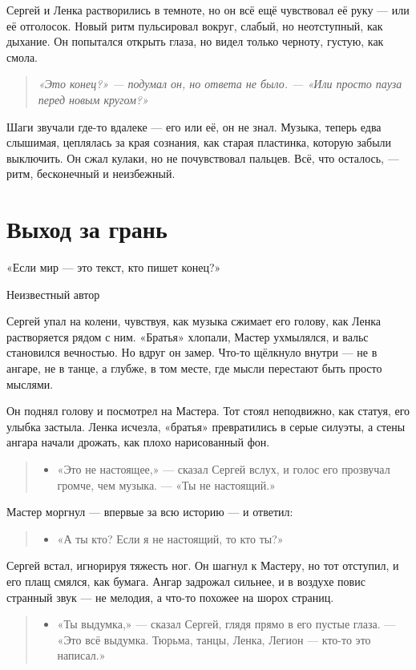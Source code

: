 \documentclass[12pt,a4paper]{book}
\newenvironment{dialogue}{\begin{quote}\itshape\begin{itemize}\item[]}{\end{itemize}\end{quote}}
\newenvironment{innerthought}{\begin{quote}\small\itshape}{\end{quote}}
\begin{document}
Сергей и Ленка растворились в темноте, но он всё ещё чувствовал её руку --- или её отголосок. Новый ритм пульсировал вокруг, слабый, но неотступный, как дыхание. Он попытался открыть глаза, но видел только черноту, густую, как смола.

\begin{innerthought}
«Это конец?» --- подумал он, но ответа не было. --- «Или просто пауза перед новым кругом?»
\end{innerthought}

Шаги звучали где-то вдалеке --- его или её, он не знал. Музыка, теперь едва слышимая, цеплялась за края сознания, как старая пластинка, которую забыли выключить. Он сжал кулаки, но не почувствовал пальцев. Всё, что осталось, --- ритм, бесконечный и неизбежный.

\chapter{Выход за грань}
\epigraph{«Если мир — это текст, кто пишет конец?»}{Неизвестный автор}

Сергей упал на колени, чувствуя, как музыка сжимает его голову, как Ленка растворяется рядом с ним. «Братья» хлопали, Мастер ухмылялся, и вальс становился вечностью. Но вдруг он замер. Что-то щёлкнуло внутри --- не в ангаре, не в танце, а глубже, в том месте, где мысли перестают быть просто мыслями.

Он поднял голову и посмотрел на Мастера. Тот стоял неподвижно, как статуя, его улыбка застыла. Ленка исчезла, «братья» превратились в серые силуэты, а стены ангара начали дрожать, как плохо нарисованный фон.

\begin{dialogue}
«Это не настоящее,» --- сказал Сергей вслух, и голос его прозвучал громче, чем музыка. --- «Ты не настоящий.»
\end{dialogue}

Мастер моргнул --- впервые за всю историю --- и ответил:

\begin{dialogue}
«А ты кто? Если я не настоящий, то кто ты?»
\end{dialogue}

Сергей встал, игнорируя тяжесть ног. Он шагнул к Мастеру, но тот отступил, и его плащ смялся, как бумага. Ангар задрожал сильнее, и в воздухе повис странный звук --- не мелодия, а что-то похожее на шорох страниц.

\begin{dialogue}
«Ты выдумка,» --- сказал Сергей, глядя прямо в его пустые глаза. --- «Это всё выдумка. Тюрьма, танцы, Ленка, Легион — кто-то это написал.»
\end{dialogue}
\end{document}
